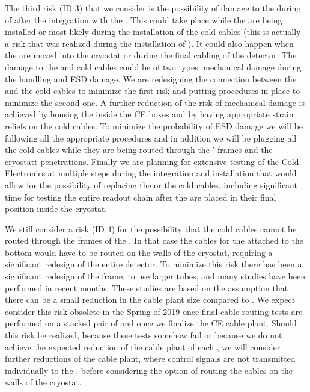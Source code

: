 The third risk (ID 3) that we consider is the possibility of damage to the 
 during of after the integration with the . This could
take place while the  are being installed or most likely during the
installation of the cold cables (this is actually a risk that was realized during
the installation of ). It could also happen when the  are
moved into the cryostat or during the final cabling of the detector. The damage
to the  and cold cables could be of two types: mechanical damage during the
handling and ESD damage. We are redesigning the connection between the 
and the cold cables to minimize the first risk and putting procedures in place
to minimize the second one. A further reduction of the risk of mechanical damage
is achieved by housing the  inside the CE boxes and by having 
appropriate strain reliefs on the cold cables. To minimize the probability of
ESD damage we will be following all the appropriate procedures and in addition
we will be plugging all the cold cables while they are being routed through the
' frames and the cryostatt penetrations. Finally we are planning for
extensive testing of the Cold Electronics at multiple steps during the integration
and installation that would allow for the possibility of replacing the 
or the cold cables, including significant time for testing the entire readout 
chain after the  are placed in their final position inside the cryostat.

We still consider a risk (ID 4) for the possibility that the cold cables cannot
be routed through the frames of the . In that case the cables for the
 attached to the bottom  would have to be routed on the
walls of the cryostat, requiring a significant redesign of the entire detector. 
To minimize this risk there has been a significant redesign of the  frame, 
to use larger tubes, and many studies have been performed in recent months. 
These studies are based on the assumption that there can be a small reduction in
the cable plant size compared to . We expect consider this risk 
obsolete in the Spring of 2019 once final cable routing tests are performed on
a stacked pair of  and once we finalize the CE cable plant. Should
this risk be realized, because these tests somehow fail or because we do not 
achieve the expected reduction of the cable plant of each , we will 
consider further reductions of the cable plant, where control signals are not
transmitted individually to the , before considering the option of 
routing the cables on the walls of the cryostat.

